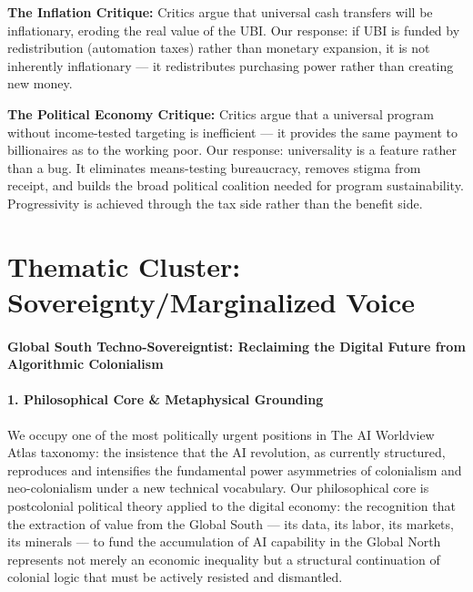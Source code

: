 \textbf{The Inflation Critique:} Critics argue that universal cash
transfers will be inflationary, eroding the real value of the UBI. Our
response: if UBI is funded by redistribution (automation taxes) rather
than monetary expansion, it is not inherently inflationary --- it
redistributes purchasing power rather than creating new money.

\textbf{The Political Economy Critique:} Critics argue that a universal
program without income-tested targeting is inefficient --- it provides
the same payment to billionaires as to the working poor. Our response:
universality is a feature rather than a bug. It eliminates means-testing
bureaucracy, removes stigma from receipt, and builds the broad political
coalition needed for program sustainability. Progressivity is achieved
through the tax side rather than the benefit side.

\section{Thematic Cluster: Sovereignty/Marginalized
Voice}\label{thematic-cluster-sovereigntymarginalized-voice}

\paragraph{Global South Techno-Sovereigntist: Reclaiming the Digital
Future from Algorithmic
Colonialism}\label{global-south-techno-sovereigntist-reclaiming-the-digital-future-from-algorithmic-colonialism}

\paragraph{1. Philosophical Core \& Metaphysical
Grounding}\label{philosophical-core-metaphysical-grounding-44}

We occupy one of the most politically urgent positions in The AI
Worldview Atlas taxonomy: the insistence that the AI revolution, as
currently structured, reproduces and intensifies the fundamental power
asymmetries of colonialism and neo-colonialism under a new technical
vocabulary. Our philosophical core is postcolonial political theory
applied to the digital economy: the recognition that the extraction of
value from the Global South --- its data, its labor, its markets, its
minerals --- to fund the accumulation of AI capability in the Global
North represents not merely an economic inequality but a structural
continuation of colonial logic that must be actively resisted and
dismantled.

